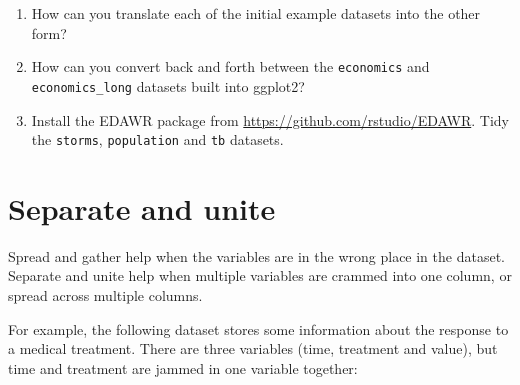 \begin{enumerate}
\def\labelenumi{\arabic{enumi}.}
\item
  How can you translate each of the initial example datasets into the
  other form?
\item
  How can you convert back and forth between the \texttt{economics} and
  \texttt{economics\_long} datasets built into ggplot2?
\item
  Install the EDAWR package from \url{https://github.com/rstudio/EDAWR}.
  Tidy the \texttt{storms}, \texttt{population} and \texttt{tb}
  datasets.
\end{enumerate}

\section{Separate and unite}\label{sec:separate-unite}

Spread and gather help when the variables are in the wrong place in the
dataset. Separate and unite help when multiple variables are crammed
into one column, or spread across multiple columns. 

For example, the following dataset stores some information about the
response to a medical treatment. There are three variables (time,
treatment and value), but time and treatment are jammed in one variable
together:

\begin{Shaded}
\begin{Highlighting}[]
\StringTok{ }\NormalTok{(}
   \NormalTok{(}\NormalTok{(}\NormalTok{(}\NormalTok{, }\NormalTok{), } \NormalTok{), }\NormalTok{, }\NormalTok{(}\NormalTok{(}\NormalTok{, }\NormalTok{, }\NormalTok{))),}
   \NormalTok{(}\NormalTok{, }\NormalTok{, }\NormalTok{, }\NormalTok{, }\NormalTok{, }\NormalTok{)}
\NormalTok{)}
\CommentTok{#> }
\end{Highlighting}
\end{Shaded}

